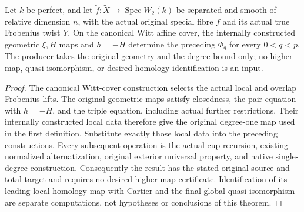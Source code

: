 \begin{theorem}
\label{thm:di-higher-exterior-witt-maps}
\leanok
{}
Let $k$ be perfect, and let
$\widetilde f:\widetilde X\to\operatorname{Spec}W_2(k)$ be separated
and smooth of relative dimension $n$, with the actual original special
fibre $f$ and its actual true Frobenius twist $Y$. On the canonical Witt
affine cover, the internally constructed geometric $\xi,H$ maps and
$h=-H$ determine the preceding $\Phi_q$ for every $0<q<p$.
The producer takes the original geometry and the degree bound only;
no higher map, quasi-isomorphism, or desired homology identification is
an input.
\end{theorem}
\begin{proof}
\leanok
The canonical Witt-cover construction selects the actual local and
overlap Frobenius lifts. The original geometric maps satisfy closedness,
the pair equation with $h=-H$, and the triple equation, including actual
further restrictions. Their internally constructed local data therefore
give the original degree-one map used in the first definition.
Substitute exactly those local data into the preceding constructions.
Every subsequent operation is the actual cup recursion, existing
normalized alternatization, original exterior universal property, and
native single-degree construction. Consequently the result has the
stated original source and total target and requires no desired
higher-map certificate. Identification of its leading local homology
map with Cartier and the final global quasi-isomorphism are separate
computations, not hypotheses or conclusions of this theorem.
\end{proof}

